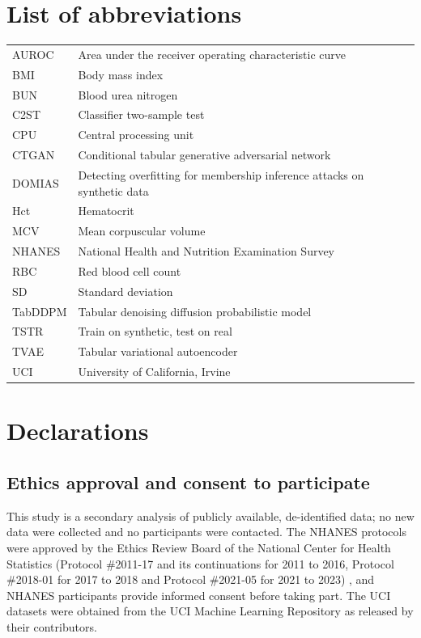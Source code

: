 \documentclass[pdflatex,referee]{sn-jnl}%
\begin{document}
\backmatter

\section*{List of abbreviations}

\begin{tabular}{@{}lp{}@{}}
AUROC & Area under the receiver operating characteristic curve \\
BMI & Body mass index \\
BUN & Blood urea nitrogen \\
C2ST & Classifier two-sample test \\
CPU & Central processing unit \\
CTGAN & Conditional tabular generative adversarial network \\
DOMIAS & Detecting overfitting for membership inference attacks on synthetic data \\
Hct & Hematocrit \\
MCV & Mean corpuscular volume \\
NHANES & National Health and Nutrition Examination Survey \\
RBC & Red blood cell count \\
SD & Standard deviation \\
TabDDPM & Tabular denoising diffusion probabilistic model \\
TSTR & Train on synthetic, test on real \\
TVAE & Tabular variational autoencoder \\
UCI & University of California, Irvine \\
\end{tabular}

\section*{Declarations}

\subsection*{Ethics approval and consent to participate}
This study is a secondary analysis of publicly available, de-identified data; no new data were collected and no participants were contacted. The NHANES protocols were approved by the Ethics Review Board of the National Center for Health Statistics (Protocol \#2011-17 and its continuations for 2011 to 2016, Protocol \#2018-01 for 2017 to 2018 and Protocol \#2021-05 for 2021 to 2023) \cite{nhaneserb}, and NHANES participants provide informed consent before taking part. The UCI datasets were obtained from the UCI Machine Learning Repository as released by their contributors.
\end{document}
